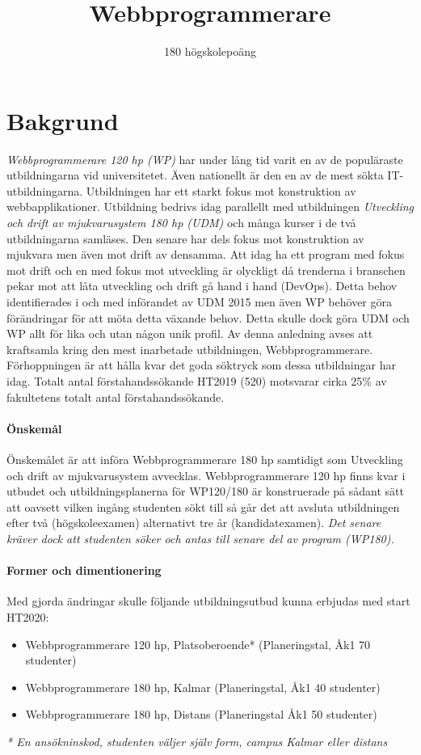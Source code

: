 \documentclass[swedish]{LnuCmThesis}
\title{Webbprogrammerare}
\subtitle{180 högskolepoäng}
\begin{document}
\maketitle
\section*{Bakgrund}
\textit{Webbprogrammerare 120 hp (WP)} har under lång tid varit en av de populäraste utbildningarna vid universitetet. Även nationellt är den en av de mest sökta IT-utbildningarna. Utbildningen har ett starkt fokus mot konstruktion av webbapplikationer. Utbildning bedrivs idag parallellt med utbildningen \textit{Utveckling och drift av mjukvarusystem 180 hp (UDM)} och många kurser i de två utbildningarna samläses. Den senare har dels fokus mot konstruktion av mjukvara men även mot drift av densamma. Att idag ha ett program med fokus mot drift och en med fokus mot utveckling är olyckligt då trenderna i branschen pekar mot att låta utveckling och drift gå hand i hand (DevOps). Detta behov identifierades i och med införandet av UDM 2015 men även WP behöver göra förändringar för att möta detta växande behov. Detta skulle dock göra UDM och WP allt för lika och utan någon unik profil. Av denna anledning avses att kraftsamla kring den mest inarbetade utbildningen, Webbprogrammerare. Förhoppningen är att hålla kvar det goda söktryck som dessa utbildningar har idag. Totalt antal förstahandssökande HT2019 (520) motsvarar cirka 25\% av fakultetens totalt antal förstahandssökande.

\paragraph{Önskemål}
Önskemålet är att införa Webbprogrammerare 180 hp samtidigt som Utveckling och drift av mjukvarusystem avvecklas. Webbprogrammerare 120 hp finns kvar i utbudet och utbildningsplanerna för WP120/180 är konstruerade på sådant sätt att oavsett vilken ingång studenten sökt till så går det att avsluta utbildningen efter två (högskoleexamen) alternativt tre år (kandidatexamen). \textit{Det senare kräver dock att studenten söker och antas till senare del av program (WP180).}

\paragraph{Former och dimentionering}
Med gjorda ändringar skulle följande utbildningsutbud kunna erbjudas med start HT2020:
\begin{itemize}
    \item Webbprogrammerare 120 hp, Platsoberoende* (Planeringstal, Åk1 70 studenter)
    \item Webbprogrammerare 180 hp, Kalmar (Planeringstal, Åk1 40 studenter)
    \item Webbprogrammerare 180 hp, Distans (Planeringstal Åk1 50 studenter)
\end{itemize}
\textit{* En ansökninskod, studenten väljer själv form, campus Kalmar eller distans}
\end{document}
